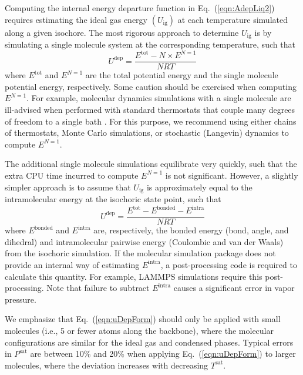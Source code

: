 \documentclass[5p,times]{elsarticle}
\begin{document}
Computing the internal energy departure function in Eq.~(\ref{eqn:AdepLiq2}) requires estimating the ideal gas energy $(U_{\mathrm{ig}})$ at each temperature simulated along a given isochore. The most rigorous approach to determine $U_{\mathrm{ig}}$ is by simulating a single molecule system at the corresponding temperature, such that
\begin{equation}\label{eqn:uDep single molecule}
U^{\mathrm{dep}} = \frac{E^{\mathrm{tot}} - N \times E^{N=1}}{NRT}
\end{equation}
where $E^{\mathrm{tot}}$ and $E^{N=1}$ are the total potential energy and the single molecule potential energy, respectively. Some caution should be exercised when computing $E^{N=1}$. For example, molecular dynamics simulations with a single molecule are ill-advised when performed with standard thermostats that couple many degrees of freedom to a single bath \cite{Merz2018}. For this purpose, we recommend using either chains of thermostats, Monte Carlo simulations, or stochastic (Langevin) dynamics \cite{Goga2012Langevin} to compute $E^{N=1}$.

The additional single molecule simulations equilibrate very quickly, such that the extra CPU time incurred to compute $E^{N=1}$ is not significant. However, a slightly simpler approach is to assume that $U_{\mathrm{ig}}$ is approximately equal to the intramolecular energy at the isochoric state point, such that
\begin{equation}
U^{\mathrm{dep}} = \frac{E^{\mathrm{tot}} - E^{\mathrm{bonded}} - E^{\mathrm{intra}}}{NRT}\label{eqn:uDepForm}
\end{equation}
where $E^{\mathrm{bonded}}$ and $E^{\mathrm{intra}}$ are, respectively, the bonded energy (bond, angle, and dihedral) and intramolecular pairwise energy (Coulombic and van der Waals) from the isochoric simulation. If the molecular simulation package does not provide an internal way of estimating $E^{\mathrm{intra}}$, a post-processing code is required to calculate this quantity. For example, LAMMPS simulations require this post-processing. Note that failure to subtract $E^{\mathrm{intra}}$ causes a significant error in vapor pressure.

We emphasize that Eq.~(\ref{eqn:uDepForm}) should only be applied with small molecules (i.e., 5 or fewer atoms along the backbone), where the molecular configurations are similar for the ideal gas and condensed phases. Typical errors in $P^{\mathrm{sat}}$ are between 10\% and 20\% when applying Eq.~(\ref{eqn:uDepForm}) to larger molecules, where the deviation increases with decreasing $T^{\mathrm{sat}}$.
\end{document}
